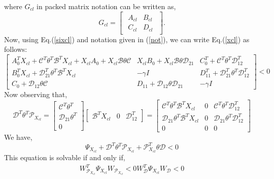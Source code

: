 \documentclass[a4paper,12pt]{article}
\begin{document}
		where $G_{cl}$ in packed matrix notation can be written as,
		\[
		G_{cl}= \begin{bmatrix}
		\begin{array}{c|c}
	A_{cl} & B_{cl}\\ \hline
	C_{cl}
	 & D_{cl}
	\end{array}
	\end{bmatrix}.
	\]
	Now, using Eq.(\ref{sixcl}) and notation given in (\ref{not}), we can write Eq.(\ref{xcl}) as follows:
	\[
	\begin{bmatrix}
	A_{0}^{T}X_{cl} + \mathscr{C}^{T}\theta^{T}\mathscr{B}^{T}X_{cl} + X_{cl}A_{0}+X_{cl}\mathscr{B}\theta\mathscr{C} & X_{cl}B_{0} + X_{cl}\mathscr{B}\theta\mathscr{D}_{21} & C_{0}^{T} + \mathscr{C}^{T}\theta^{T}\mathscr{D}_{12}^{T} \\
	B_{0}^{T}X_{cl} + \mathscr{D}_{21}^{T}\theta^{T}\mathscr{B}^{T}X_{cl} & -\gamma I & D_{11}^{T} + \mathscr{D}_{21}^{T}\theta^{T}\mathscr{D}_{12}^{T} \\
	C_{0} + \mathscr{D}_{12}\theta\mathscr{C} & D_{11} + \mathscr{D}_{12}\theta\mathscr{D}_{21} & -\gamma I 
	\end{bmatrix}
	<0
	\]
	Now observing that,
	\[
	\mathscr{D}^{T}\theta^{T}\mathscr{P}_{X_{cl}} = 
	\begin{bmatrix}
	\mathscr{C}^{T}\theta^{T} \\ \mathscr{D}_{21}\theta^{T} \\ 0
	\end{bmatrix}
	\begin{bmatrix}
	\mathscr{B}^{T}X_{cl} & 0 & \mathscr{D}_{12}^{T}
	\end{bmatrix}
	=
	\begin{bmatrix}
	\mathscr{C}^{T}\theta^{T}\mathscr{B}^{T}X_{cl} & 0 & \mathscr{C}^{T}\theta^{T}\mathscr{D}_{12}^{T} \\
	\mathscr{D}_{21}\theta^{T}\mathscr{B}^{T}X_{cl} & 0 & \mathscr{D}_{21}\theta^{T}\mathscr{D}_{12}^{T}\\
	0 & 0 & 0
	\end{bmatrix}
	\]
	We have,
	\begin{equation}
	\Psi_{X_{cl}} + \mathscr{D}^{T}\theta^{T}\mathscr{P}_{X_{cl}} + \mathscr{P}_{X_{cl}}^{T}\theta\mathscr{D} < 0 
	\label{A}
	\end{equation}
	This equation is solvable if and only if,
	\begin{align}
	\label{tophi}
	W_{\mathscr{P}_{X_{cl}}}^{T}\Psi_{X_{cl}}W_{\mathscr{P}_{X_{cl}}} < 0 
	W_{\mathscr{D}}^{T}\Psi_{X_{cl}}W_{\mathscr{D}} < 0 
	\end{align}
\end{document}
